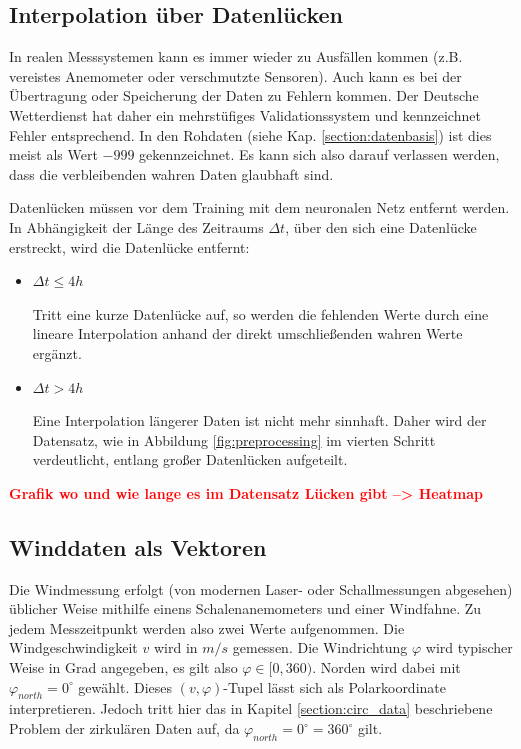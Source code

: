 \documentclass[
12pt, %
toc=listofnumbered, %
toc=chapterentrydotfill, %
numbers=noenddot, %
captions=tableheading, %
bibliography=numbered
]{scrreprt}
\let\Oldsubsection\subsection
\renewcommand{\subsection}{\FloatBarrier\Oldsubsection}
\newcommand{\qm}[1]{\glqq#1\grqq{}} %
\newcommand{\highlight}[1]{\textbf{\textcolor{red}{#1}}}
\begin{document}
\subsection{Interpolation über Datenlücken}\label{section:Datenlücken}

In realen Messsystemen kann es immer wieder zu Ausfällen kommen (z.B. vereistes Anemometer oder verschmutzte Sensoren). Auch kann es bei der Übertragung oder Speicherung der Daten zu Fehlern kommen. Der Deutsche Wetterdienst hat daher ein mehrstüfiges Validationssystem und kennzeichnet Fehler entsprechend. In den Rohdaten (siehe Kap. \ref{section:datenbasis}) ist dies meist als Wert $-999$ gekennzeichnet. Es kann sich also darauf verlassen werden, dass die verbleibenden \qm{wahren} Daten glaubhaft sind. 

Datenlücken müssen vor dem Training mit dem neuronalen Netz entfernt werden. In Abhängigkeit der Länge des Zeitraums $\Delta t$, über den sich eine Datenlücke erstreckt, wird die Datenlücke entfernt:

\begin{itemize}
	\item $\Delta t \leq 4h$
	
	Tritt eine kurze Datenlücke auf, so werden die fehlenden Werte durch eine lineare Interpolation anhand der direkt umschließenden wahren Werte ergänzt.

	\item $\Delta t > 4h$

	Eine Interpolation längerer Daten ist nicht mehr sinnhaft. Daher wird der Datensatz, wie in Abbildung \ref{fig:preprocessing} im vierten Schritt verdeutlicht, entlang großer Datenlücken aufgeteilt.

\end{itemize}

\highlight{Grafik wo und wie lange es im Datensatz Lücken gibt --> Heatmap}

\subsection{Winddaten als Vektoren}\label{section:Winddaten_vec}
Die Windmessung erfolgt (von modernen Laser- oder Schallmessungen abgesehen) üblicher Weise mithilfe einens Schalenanemometers und einer Windfahne. Zu jedem Messzeitpunkt werden also zwei Werte aufgenommen. Die Windgeschwindigkeit $v$ wird in $m/s$ gemessen. Die Windrichtung $\varphi$ wird typischer Weise in Grad angegeben, es gilt also $\varphi \in [0,360)$. Norden wird dabei mit $\varphi_{north} = 0^\circ$ gewählt. Dieses $(v,\varphi)$-Tupel lässt sich als Polarkoordinate interpretieren. Jedoch tritt hier das in Kapitel \ref{section:circ_data} beschriebene Problem der zirkulären Daten auf, da $\varphi_{north} = 0^\circ = 360^\circ$ gilt.
\end{document}

